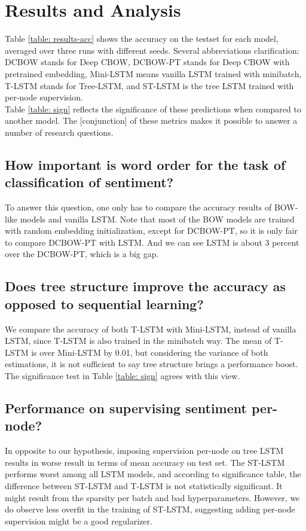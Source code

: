 \section{Results and Analysis}
\label{sec: results}
Table \ref{table: results-acc} shows the accuracy on the testset for each model,
averaged over three runs with different seeds. Several abbreviations
clarification: DCBOW stands for Deep CBOW, DCBOW-PT stands for Deep CBOW with
pretrained embedding, Mini-LSTM means vanilla LSTM trained with minibatch,
T-LSTM stands for Tree-LSTM, and ST-LSTM is the tree LSTM trained with per-node
supervision. \\ Table \ref{table: sign} reflects the significance of these
predictions when compared to another model. The [conjunction] of these metrics
makes it possible to answer a number of research questions. \\
    \vspace{-10pt}
    \subsection{How important is word order for the task of classification of
    sentiment?} To answer this question, one only has to compare the accuracy
    results of BOW-like models and vanilla LSTM. Note that most of the BOW
    models are trained with random embedding initialization, except for
    DCBOW-PT, so it is only fair to compare DCBOW-PT with LSTM. And we can see
    LSTM is about 3 percent over the DCBOW-PT, which is a big gap.
    \subsection{Does tree structure improve the accuracy as opposed to
    sequential learning?} We compare the accuracy of both T-LSTM with Mini-LSTM,
    instead of vanilla LSTM, since T-LSTM is also trained in the minibatch way.
    The mean of T-LSTM is over Mini-LSTM by 0.01, but considering the variance
    of both estimations, it is not sufficient to say tree structure brings a
    performance boost. The significance test in Table \ref{table: sign} agrees
    with this view.
    \subsection{Performance on supervising sentiment per-node?} 
    In opposite to our hypothesis, imposing supervision per-node on tree LSTM
    results in worse result in terms of mean accuracy on test set. The ST-LSTM
    performs worst among all LSTM models, and according to significance table,
    the difference between ST-LSTM and T-LSTM is not statistically significant.
    It might result from the sparsity per batch and bad hyperparameters.
    However, we do observe less overfit in the training of ST-LSTM, suggesting
    adding per-node supervision might be a good regularizer.
